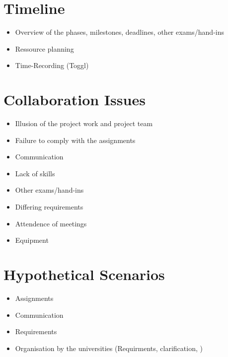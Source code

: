 \section{Timeline}

	\begin{itemize}
		\item Overview of the phases, milestones, deadlines, other exams/hand-ins
		\item Ressource planning
		\item Time-Recording (Toggl)
	\end{itemize}



\section{Collaboration Issues}

	\begin{itemize}

		\item Illusion of the project work and project team
		\item Failure to comply with the assignments
		\item Communication
		\item Lack of skills
		\item Other exams/hand-ins
		\item Differing requirements
		\item Attendence of meetings
		\item Equipment

	\end{itemize}



\section{Hypothetical Scenarios}

	\begin{itemize}
		\item Assignments
		\item Communication
		\item Requirements
		\item Organisation by the universities (Requirments, clarification, )
	\end{itemize}
